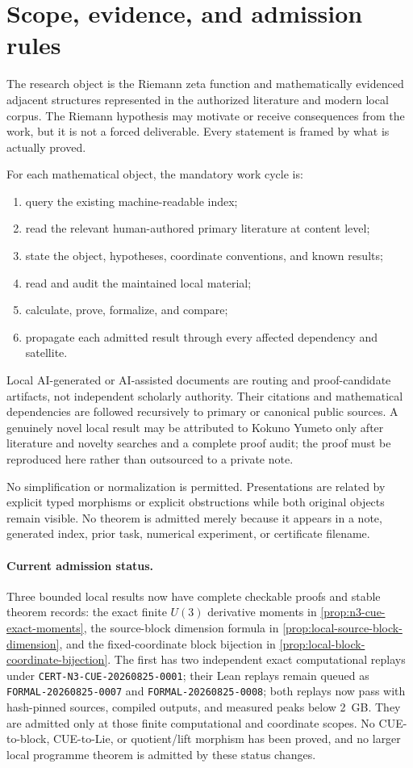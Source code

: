 \section{Scope, evidence, and admission rules}

The research object is the Riemann zeta function and mathematically evidenced adjacent
structures represented in the authorized literature and modern local corpus.  The Riemann
hypothesis may motivate or receive consequences from the work, but it is not a forced
deliverable.  Every statement is framed by what is actually proved.

For each mathematical object, the mandatory work cycle is:
\begin{enumerate}[label=\arabic*.]
  \item query the existing machine-readable index;
  \item read the relevant human-authored primary literature at content level;
  \item state the object, hypotheses, coordinate conventions, and known results;
  \item read and audit the maintained local material;
  \item calculate, prove, formalize, and compare;
  \item propagate each admitted result through every affected dependency and satellite.
\end{enumerate}

Local AI-generated or AI-assisted documents are routing and proof-candidate artifacts, not
independent scholarly authority.  Their citations and mathematical dependencies are followed
recursively to primary or canonical public sources.  A genuinely novel local result may be
attributed to Kokuno Yumeto only after literature and novelty searches and a complete proof
audit; the proof must be reproduced here rather than outsourced to a private note.

No simplification or normalization is permitted.  Presentations are related by explicit typed
morphisms or explicit obstructions while both original objects remain visible.  No theorem is
admitted merely because it appears in a note, generated index, prior task, numerical experiment,
or certificate filename.

\paragraph{Current admission status.}
Three bounded local results now have complete checkable proofs and stable theorem records: the
exact finite $U(3)$ derivative moments in \cref{prop:n3-cue-exact-moments}, the source-block
dimension formula in \cref{prop:local-source-block-dimension}, and the fixed-coordinate block
bijection in \cref{prop:local-block-coordinate-bijection}.  The first has two independent exact
computational replays under \texttt{CERT-N3-CUE-20260825-0001}; their Lean replays remain queued
as \texttt{FORMAL-20260825-0007} and \texttt{FORMAL-20260825-0008}; both replays now pass with
hash-pinned sources, compiled outputs, and measured peaks below 2~GB.  They are admitted only at
those finite computational and coordinate scopes.  No CUE-to-block, CUE-to-Lie, or quotient/lift
morphism has been proved, and no larger local programme theorem is admitted by these status
changes.
